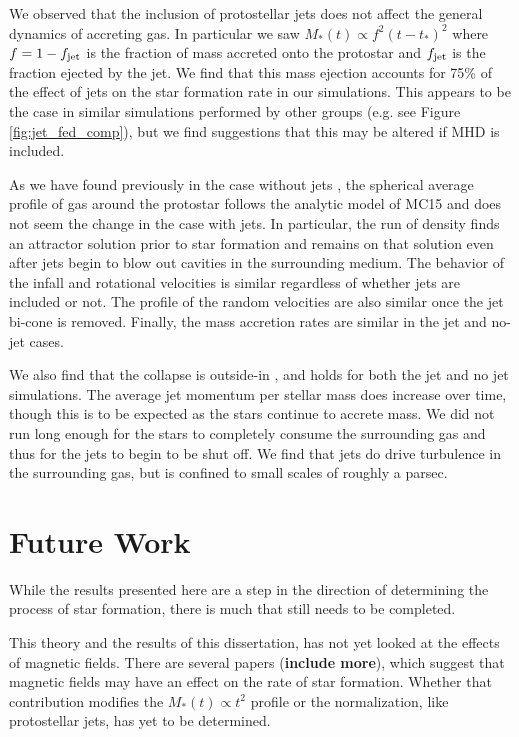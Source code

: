 \documentclass[../dissertation.tex]{subfiles}
\begin{document}
We observed that the inclusion of protostellar jets does not affect the general dynamics of accreting gas.
In particular we saw $M_*(t) \propto f^2 (t-t_*)^2$ where $f = 1 - f_{\rm jet}$ is the fraction of mass accreted onto the protostar and $f_{\rm jet}$ is the fraction ejected by the jet.
We find that this mass ejection accounts for 75\% of the effect of jets on the star formation rate in our simulations.
This appears to be the case in similar simulations performed by other groups (e.g. see Figure \ref{fig:jet_fed_comp}), but we find suggestions that this may be altered if MHD is included.

As we have found previously in the case without jets \citep{2017MNRAS.465.1316M}, the spherical average profile of gas around the protostar follows the analytic model of MC15 and does not seem the change in the case with jets.  In particular, the run of density finds an attractor solution prior to star formation and remains on that solution even after jets begin to blow out cavities in the surrounding medium.
The behavior of the infall and rotational velocities is similar regardless of whether jets are included or not.
The profile of the random velocities are also similar once the jet bi-cone is removed.  Finally, the mass accretion rates are similar in the jet and no-jet cases.

We also find that the collapse is outside-in  \citep{2017MNRAS.465.1316M}, and holds for both the jet and no jet simulations.
The average jet momentum per stellar mass does increase over time, though this is to be expected as the stars continue to accrete mass.
We did not run long enough for the stars to completely consume the surrounding gas and thus for the jets to begin to be shut off.
We find that jets do drive turbulence in the surrounding gas, but is confined to small scales of roughly a parsec.

\section{Future Work}
While the results presented here are a step in the direction of determining the process of star formation, there is much that still needs to be completed. 

This theory and the results of this dissertation, has not yet looked at the effects of magnetic fields. 
There are several papers \citet{2017ApJ...838...40M} ({\bf include more}), which suggest that magnetic fields may have an effect on the rate of star formation. 
Whether that contribution modifies the $M_*(t) \propto t^2$ profile or the normalization, like protostellar jets, has yet to be determined. 
\end{document}
